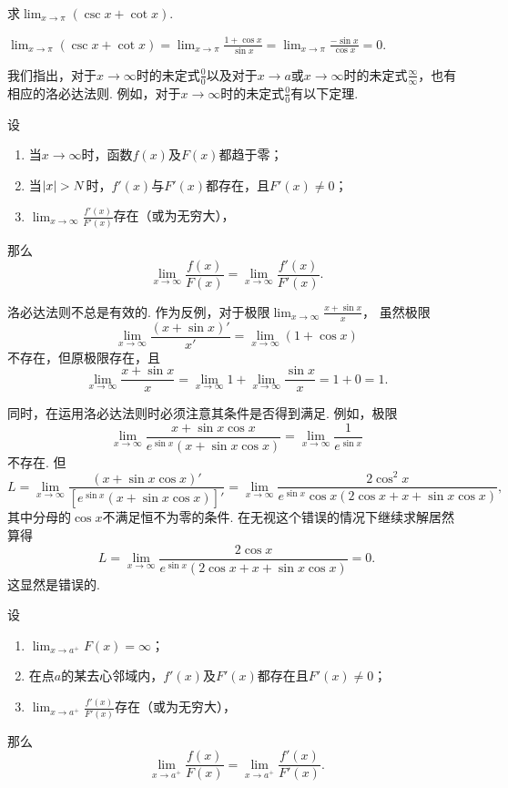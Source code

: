 \begin{example}
求\(\lim_{x\to\pi} (\csc x+\cot x)\).
\begin{solution}
\(\lim_{x\to\pi} (\csc x+\cot x)
= \lim_{x\to\pi} \frac{1+\cos x}{\sin x}
= \lim_{x\to\pi} \frac{-\sin x}{\cos x}
= 0\).
\end{solution}
\end{example}

我们指出，对于\(x\to\infty\)时的未定式\(\frac{0}{0}\)以及对于\(x \to a\)或\(x\to\infty\)时的未定式\(\frac{\infty}{\infty}\)，也有相应的洛必达法则.
例如，对于\(x\to\infty\)时的未定式\(\frac{0}{0}\)有以下定理.
\begin{theorem}\label{theorem:微分中值定理.洛必达法则2}
\def\l{\lim_{x\to\infty}}
设\begin{enumerate}
	\item 当\(x\to\infty\)时，函数\(f(x)\)及\(F(x)\)都趋于零；
	\item 当\(\abs{x}>N\)时，\(f'(x)\)与\(F'(x)\)都存在，且\(F'(x) \neq 0\)；
	\item \(\l\frac{f'(x)}{F'(x)}\)存在（或为无穷大），
\end{enumerate}那么\[
	\l\frac{f(x)}{F(x)} = \l\frac{f'(x)}{F'(x)}.
\]
\end{theorem}

\begin{example}
\def\l{\lim_{x\to\infty}}%
\def\a{\l\frac{x+\sin x}{x}}%
洛必达法则不总是有效的.
作为反例，对于极限\(\a\)，
虽然极限\[
\l\frac{(x+\sin x)'}{x'} = \l(1+\cos x)
\]不存在，但原极限存在，且
\[
\a = \l1+\l\frac{\sin x}{x} = 1 + 0 = 1.
\]

\def\l{\lim_{x\to\infty}}%
\def\a{\l\frac{x+\sin x \cos x}{e^{\sin x}(x+\sin x \cos x)}}%
同时，在运用洛必达法则时必须注意其条件是否得到满足.
例如，极限\[
\a = \l\frac{1}{e^{\sin x}}
\]不存在.
但\[
L = \l\frac{(x+\sin x \cos x)'}{[e^{\sin x}(x+\sin x \cos x)]'} = \l\frac{2\cos^2 x}{e^{\sin x}\cos x(2\cos x + x + \sin x \cos x)},
\]其中分母的\(\cos x\)不满足恒不为零的条件.
在无视这个错误的情况下继续求解居然算得
\[
L = \l\frac{2\cos x}{e^{\sin x}(2\cos x + x + \sin x \cos x)} = 0.
\]
这显然是错误的.
\end{example}

\begin{theorem}\label{theorem:微分中值定理.洛必达法则3}
\def\l{\lim_{x \to a^+}}
设\begin{enumerate}
\item \(\l F(x) = \infty\)；
\item 在点\(a\)的某去心邻域内，\(f'(x)\)及\(F'(x)\)都存在且\(F'(x) \neq 0\)；
\item \(\l\frac{f'(x)}{F'(x)}\)存在（或为无穷大），
\end{enumerate}那么\[
\l\frac{f(x)}{F(x)} = \l\frac{f'(x)}{F'(x)}.
\]
\end{theorem}

